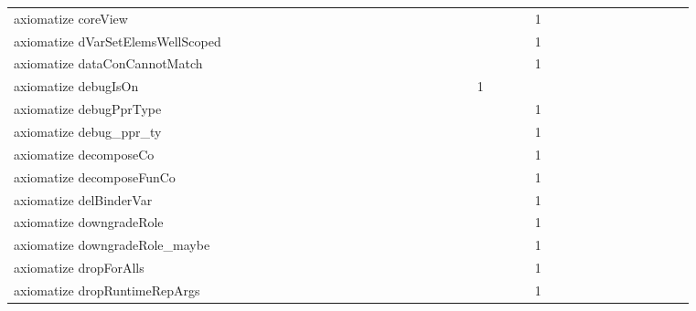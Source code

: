 {\begin{tabular}{l|rrr|rrr|rrr}
axiomatize coreView &  &  &  &  &  &  &  &  &  &  &  &  &  &  &  &  &  &  &  &  &  &  &  & 1 &  &  &  &  &  &  &  &  &  &  &  & \\
axiomatize dVarSetElemsWellScoped &  &  &  &  &  &  &  &  &  &  &  &  &  &  &  &  &  &  &  &  &  &  &  & 1 &  &  &  &  &  &  &  &  &  &  &  & \\
axiomatize dataConCannotMatch &  &  &  &  &  &  &  &  &  &  &  &  &  &  &  &  &  &  &  &  &  &  &  & 1 &  &  &  &  &  &  &  &  &  &  &  & \\
axiomatize debugIsOn &  &  &  &  &  &  &  &  &  &  &  &  &  &  &  &  &  &  &  & 1 &  &  &  &  &  &  &  &  &  &  &  &  &  &  &  & \\
axiomatize debugPprType &  &  &  &  &  &  &  &  &  &  &  &  &  &  &  &  &  &  &  &  &  &  &  & 1 &  &  &  &  &  &  &  &  &  &  &  & \\
axiomatize debug_ppr_ty &  &  &  &  &  &  &  &  &  &  &  &  &  &  &  &  &  &  &  &  &  &  &  & 1 &  &  &  &  &  &  &  &  &  &  &  & \\
axiomatize decomposeCo &  &  &  &  &  &  &  &  &  &  &  &  &  &  &  &  &  &  &  &  &  &  &  & 1 &  &  &  &  &  &  &  &  &  &  &  & \\
axiomatize decomposeFunCo &  &  &  &  &  &  &  &  &  &  &  &  &  &  &  &  &  &  &  &  &  &  &  & 1 &  &  &  &  &  &  &  &  &  &  &  & \\
axiomatize delBinderVar &  &  &  &  &  &  &  &  &  &  &  &  &  &  &  &  &  &  &  &  &  &  &  & 1 &  &  &  &  &  &  &  &  &  &  &  & \\
axiomatize downgradeRole &  &  &  &  &  &  &  &  &  &  &  &  &  &  &  &  &  &  &  &  &  &  &  & 1 &  &  &  &  &  &  &  &  &  &  &  & \\
axiomatize downgradeRole_maybe &  &  &  &  &  &  &  &  &  &  &  &  &  &  &  &  &  &  &  &  &  &  &  & 1 &  &  &  &  &  &  &  &  &  &  &  & \\
axiomatize dropForAlls &  &  &  &  &  &  &  &  &  &  &  &  &  &  &  &  &  &  &  &  &  &  &  & 1 &  &  &  &  &  &  &  &  &  &  &  & \\
axiomatize dropRuntimeRepArgs &  &  &  &  &  &  &  &  &  &  &  &  &  &  &  &  &  &  &  &  &  &  &  & 1 &  &  &  &  &  &  &  &  &  &  &  & \\

\end{tabular}}
